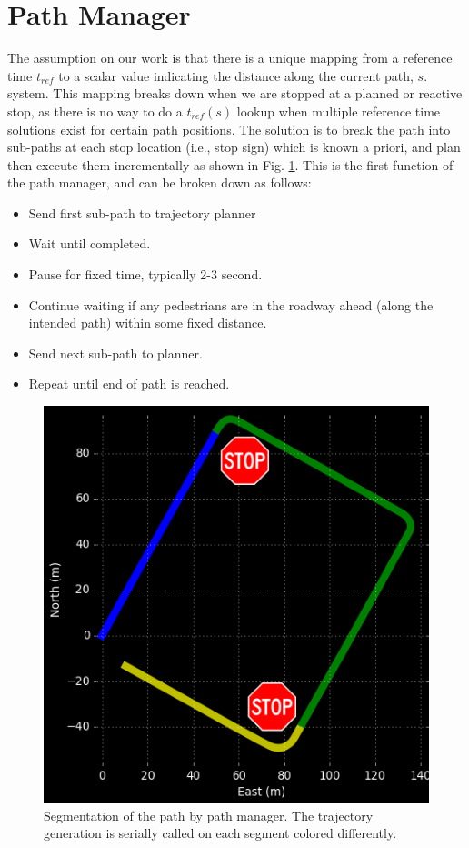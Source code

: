 \documentclass[letterpaper, 10 pt, conference]{ieeeconf}  %
\begin{document}

\section{Path Manager} \label{sec:pathmanager}


The assumption on our work is that there is a unique mapping from a reference time $t_{ref}$ to a scalar value indicating the distance along the current path, $s$.
system.
This mapping breaks down when we are stopped at a planned or reactive stop, as there is no way to do a $t_{ref}(s)$ lookup when multiple reference time solutions exist for certain path positions.
The solution is to break the path into sub-paths at each stop location (i.e., stop sign) which is known a priori, and plan then execute them incrementally as shown in Fig. \ref{fig:segmentation}.
This is the first function of the path manager, and can be broken down as follows:
\begin{itemize}
\item Send first sub-path to trajectory planner
\item Wait until completed.
\item Pause for fixed time, typically 2-3 second.
\item Continue waiting if any pedestrians are in the roadway ahead (along the intended path) within some fixed distance.
\item Send next sub-path to planner.
\item Repeat until end of path is reached.
\end{itemize}

\begin{figure}[thpb]
  \centering
  \includegraphics[width=0.5\columnwidth]{graphics/Subpaths.png}
  \caption{
    Segmentation of the path by path manager.
    The trajectory generation is serially called on each segment colored differently.
  }
  \label{fig:segmentation}
\end{figure}
\end{document}
